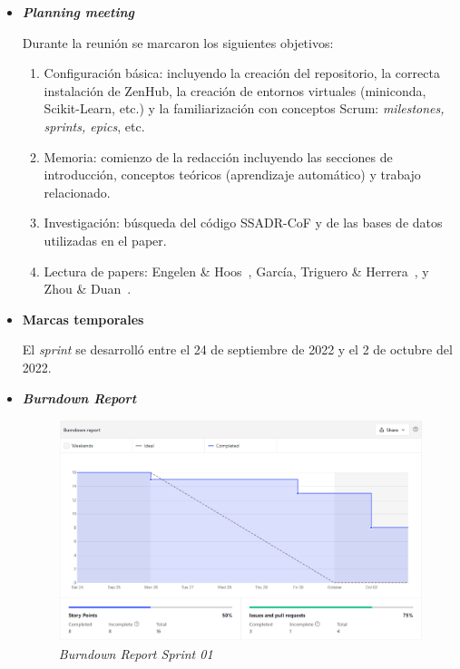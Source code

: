 \begin{itemize}
	\item \textbf{\textit{Planning meeting}}
	
	Durante la reunión se marcaron los siguientes objetivos:
	
	\begin{enumerate}
		\item Configuración básica: incluyendo la creación del repositorio, la correcta instalación de ZenHub, la creación de entornos virtuales (miniconda, Scikit-Learn, etc.) y la familiarización con conceptos Scrum: \textit{milestones, sprints, epics}, etc.
		\item Memoria: comienzo de la redacción incluyendo las secciones de introducción, conceptos teóricos (aprendizaje automático) y trabajo relacionado.
		\item Investigación: búsqueda del código SSADR-CoF y de las bases de datos utilizadas en el paper.
		\item Lectura de papers: Engelen \& Hoos~\cite{engelen2020surveyOnSemiSupervised}, García, Triguero \& Herrera~\cite{triguero2015SelflabeledTechniques}, y Zhou \& Duan~\cite{zhou2021SemisupervisedRecommendationAttack}.
	\end{enumerate}
	
	\item \textbf{Marcas temporales}
	
	El \textit{sprint} se desarrolló entre el 24 de septiembre de 2022 y el 2 de octubre del 2022.
	
	\item \textbf{\textit{Burndown Report}}
	\begin{figure}[h]
		\caption{\textit{Burndown Report Sprint 01}}
		\centering
		\includegraphics[width=\textwidth]{../img/anexos/bdr/s01_bdr}
	\end{figure}
	

\end{itemize}
